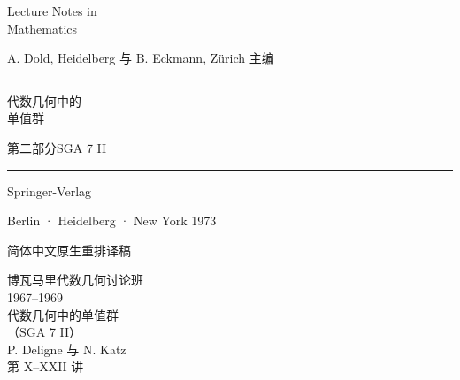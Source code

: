 \documentclass[11pt,a4paper,leqno,fontset=none]{ctexart}
\newcommand{\CurrentExpose}{引言}
\begin{document}
\begin{titlepage}
\sffamily
\noindent\hspace*{.19\textwidth}\begin{minipage}{.79\textwidth}
\vspace*{.4cm}
{\fontsize{34}{41}\selectfont Lecture Notes in\\ Mathematics\par}
\vspace{1.2cm}
{\small A. Dold, Heidelberg 与 B. Eckmann, Zürich 主编\par}
\vspace{2.3cm}
{\fontsize{28}{32}\par}
\end{minipage}
\par\vspace{.45cm}
\noindent\rule{\textwidth}{1.2pt}\par
\vspace{.65cm}
\noindent\hspace*{.19\textwidth}\begin{minipage}{.79\textwidth}
{\fontsize{27}{38}\selectfont 代数几何中的\\单值群\par}
\vspace{.5cm}
{\Large 第二部分\quad SGA 7 II\par}
\end{minipage}
\vfill
\par\noindent\rule{\textwidth}{1.2pt}\par
\vspace{.6cm}
\noindent\hspace*{.19\textwidth}\begin{minipage}{.79\textwidth}
{\Large Springer-Verlag\par}
{\large Berlin · Heidelberg · New York 1973\par}
\medskip
{\small 简体中文原生重排译稿\par}
\end{minipage}
\end{titlepage}
\begin{titlepage}
\centering
\vspace*{1.8cm}
博瓦马里代数几何讨论班\\[1em]
1967--1969\\[2.6em]
{\Large 代数几何中的单值群}\\[1.5em]
{\large（SGA 7 II）}\\[3em]
P. Deligne 与 N. Katz\\[5em]
第 X--XXII 讲
\vfill
\end{titlepage}
\clearpage
\renewcommand{\CurrentExpose}{目录}
\setcounter{tocdepth}{1}
\tableofcontents
\clearpage
{}

\end{document}
